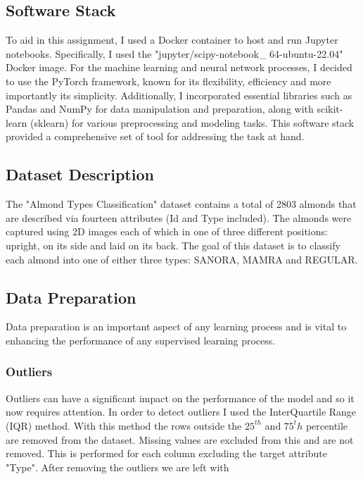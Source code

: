 \documentclass[conference]{IEEEtran}
\begin{document}
\subsection{Software Stack}
To aid in this assignment, I used a Docker container to host and run Jupyter notebooks. Specifically, I used the "jupyter/scipy-notebook\_ 64-ubuntu-22.04" Docker image. For the machine learning and neural network processes, I decided to use the PyTorch framework, known for its flexibility, efficiency and more importantly its simplicity. Additionally, I incorporated essential libraries such as Pandas and NumPy for data manipulation and preparation, along with scikit-learn (sklearn) for various preprocessing and modeling tasks. This software stack provided a comprehensive set of tool for addressing the task at hand.

\subsection{Dataset Description}
The "Almond Types Classification" dataset contains a total of 2803 almonds that are described via fourteen attributes (Id and Type included). The almonds were captured using 2D images each of which in one of three different positions: upright, on its side and laid on its back. The goal of this dataset is to classify each almond into one of either three types: SANORA, MAMRA and REGULAR.

\subsection{Data Preparation}
Data preparation is an important aspect of any learning process and is vital to enhancing the performance of any supervised learning process.
\newline \\
\subsubsection{Outliers}
Outliers can have a significant impact on the performance of the model and so it now requires attention. In order to detect outliers I used the InterQuartile Range (IQR) method. With this method the rows outside the $25^{th}$ and $75^th$ percentile are removed from the dataset. Missing values are excluded from this and are not removed. This is performed for each column excluding the target attribute "Type". After removing the outliers we are left with
\newline \\
\end{document}
